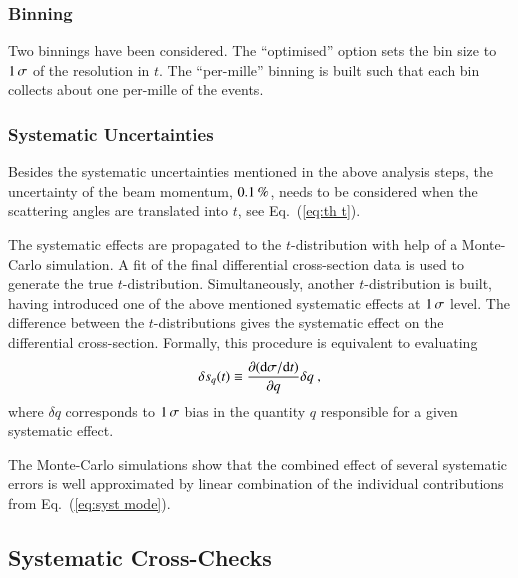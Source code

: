 
\subsubsection{Binning}
\label{sec:binning}

Two binnings have been considered. The ``optimised'' option sets the bin size to $1\,{\rm \sigma}$ of the resolution in $t$. The ``per-mille'' binning is built such that each bin collects about one per-mille of the events.



\subsubsection{Systematic Uncertainties}
\label{sec:systematics}

Besides the systematic uncertainties mentioned in the above analysis steps, the uncertainty of the beam momentum, $0.1\,{\rm \%}$, needs to be considered when the scattering angles are translated into $t$, see Eq.~(\ref{eq:th t}).

The systematic effects are propagated to the $t$-distribution with help of a Monte-Carlo simulation. A fit of the final differential cross-section data is used to generate the true $t$-distribution. Simultaneously, another $t$-distribution is built, having introduced one of the above mentioned systematic effects at $1\,{\rm \sigma}$ level. The difference between the $t$-distributions gives the systematic effect on the differential cross-section. Formally, this procedure is equivalent to evaluating
\begin{equation}
\label{eq:syst mode}
\delta s_{q}(t) \equiv \frac{\partial({\rm d}\sigma/{\rm d} t)}{\partial q} \delta q\ ,
\end{equation}
where $\delta q$ corresponds to $1\,{\rm \sigma}$ bias in the quantity $q$ responsible for a given systematic effect.

The Monte-Carlo simulations show that the combined effect of several systematic errors is well approximated by linear combination of the individual contributions from Eq.~(\ref{eq:syst mode}).



\subsection{Systematic Cross-Checks}
\label{sec:cross checks}


